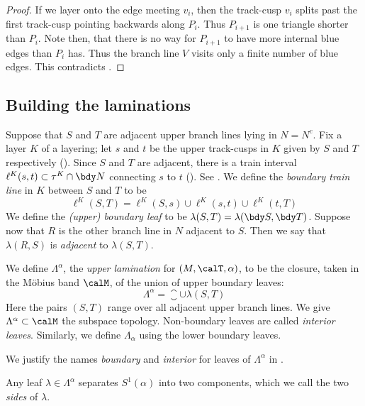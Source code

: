 \documentclass[12pt]{amsart}
\begin{document}
\begin{proof}
If we layer onto the edge meeting $v_i$, then the track-cusp $v_i$ splits past the first track-cusp pointing backwards along $P_i$.  Thus $P_{i+1}$ is one triangle shorter than $P_i$.  Note then, that there is no way for $P_{i+1}$ to have more internal blue edges than $P_i$ has.  Thus the branch line $V$ visits only a finite number of blue edges.  This contradicts .
\end{proof}

\subsection{Building the laminations}

Suppose that $S$ and $T$ are adjacent upper branch lines lying in $N = N^c$.  Fix a layer $K$ of a layering; let $s$ and $t$ be the upper track-cusps in $K$ given by $S$ and $T$ respectively ().  Since $S$ and $T$ are adjacent, there is a train interval $\ell^K(s, t) \subset \tau^K \cap \bdy N$ connecting $s$ to $t$ ().  See .  We define the \emph{boundary train line} in $K$ between $S$ and $T$ to be 
\[
\ell^K(S, T) = \ell^K(S, s) \cup \ell^K(s, t) \cup \ell^K(t, T)
\]
We define the \emph{(upper) boundary leaf} to be $\lambda(S, T) = \lambda(\bdy S, \bdy T)$. Suppose now that $R$ is the other branch line in $N$ adjacent to $S$. Then we say that $\lambda(R,S)$ is \emph{adjacent} to $\lambda(S, T)$.

\begin{definition}
\label{Def:UpperLamination}
We define $\Lambda^\alpha$, the \emph{upper lamination} for $(M, \calT, \alpha)$, to be the closure, taken in the M\"obius band $\calM$, of the union of upper boundary leaves:
\[
\Lambda^\alpha = \closure{\cup \lambda(S, T)}
\]
Here the pairs $(S, T)$ range over all adjacent upper branch lines. We give $\Lambda^\alpha \subset \calM$ the subspace topology. Non-boundary leaves are called \emph{interior leaves}.  Similarly, we define $\Lambda_\alpha$ using the lower boundary leaves. 
\end{definition}



\begin{remark}
We justify the names \emph{boundary} and \emph{interior} for leaves of $\Lambda^\alpha$ in .
\end{remark}

\begin{definition}
Any leaf $\lambda \in \Lambda^\alpha$ separates $S^1(\alpha)$ into two components, which we call the two \emph{sides} of $\lambda$. 
\end{definition}
\end{document}
